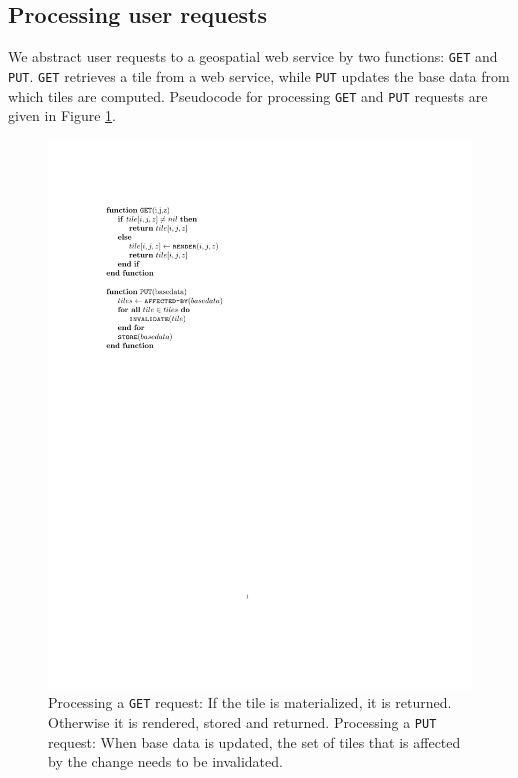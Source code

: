 \documentclass[11pt, oneside]{report}
\begin{document}
\subsection{Processing user requests}
\label{sec:processing:user:requests}
We abstract user requests to a geospatial web service by two functions: \texttt{GET} and \texttt{PUT}. \texttt{GET} retrieves a tile from a web service, while \texttt{PUT} updates the base data from which tiles are computed. Pseudocode for processing \texttt{GET} and \texttt{PUT} requests are given in Figure \ref{fig:pseudocode}.

\begin{figure}[ht]
\includegraphics[scale=0.9]{figs-tileheat/pseudocode}
\caption{Processing a \texttt{GET} request: If the tile is materialized, it is returned. Otherwise it is rendered, stored and returned. Processing a \texttt{PUT} request: When base data is updated, the set of tiles that is affected by the change needs to be invalidated.}
\label{fig:pseudocode}
\end{figure}
\end{document}

